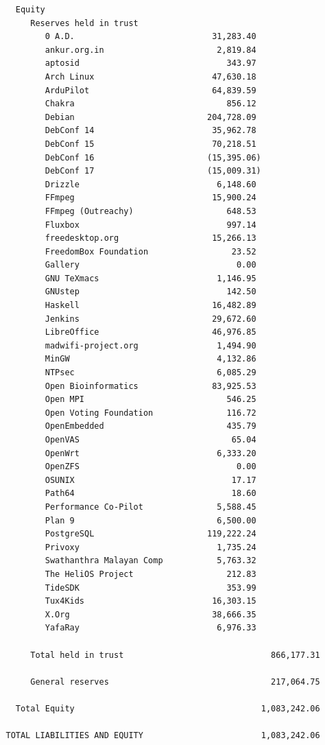 \documentclass[a4paper]{report}
\begin{document}
\begin{verbatim}
     Equity
        Reserves held in trust
           0 A.D.                            31,283.40
           ankur.org.in                       2,819.84
           aptosid                              343.97
           Arch Linux                        47,630.18
           ArduPilot                         64,839.59
           Chakra                               856.12
           Debian                           204,728.09
           DebConf 14                        35,962.78
           DebConf 15                        70,218.51
           DebConf 16                       (15,395.06)
           DebConf 17                       (15,009.31)
           Drizzle                            6,148.60
           FFmpeg                            15,900.24
           FFmpeg (Outreachy)                   648.53
           Fluxbox                              997.14
           freedesktop.org                   15,266.13
           FreedomBox Foundation                 23.52
           Gallery                                0.00
           GNU TeXmacs                        1,146.95
           GNUstep                              142.50
           Haskell                           16,482.89
           Jenkins                           29,672.60
           LibreOffice                       46,976.85
           madwifi-project.org                1,494.90
           MinGW                              4,132.86
           NTPsec                             6,085.29
           Open Bioinformatics               83,925.53
           Open MPI                             546.25
           Open Voting Foundation               116.72
           OpenEmbedded                         435.79
           OpenVAS                               65.04
           OpenWrt                            6,333.20
           OpenZFS                                0.00
           OSUNIX                                17.17
           Path64                                18.60
           Performance Co-Pilot               5,588.45
           Plan 9                             6,500.00
           PostgreSQL                       119,222.24
           Privoxy                            1,735.24
           Swathanthra Malayan Comp           5,763.32
           The HeliOS Project                   212.83
           TideSDK                              353.99
           Tux4Kids                          16,303.15
           X.Org                             38,666.35
           YafaRay                            6,976.33

        Total held in trust                              866,177.31

        General reserves                                 217,064.75

     Total Equity                                      1,083,242.06

   TOTAL LIABILITIES AND EQUITY                        1,083,242.06
\end{verbatim}
\end{document}
